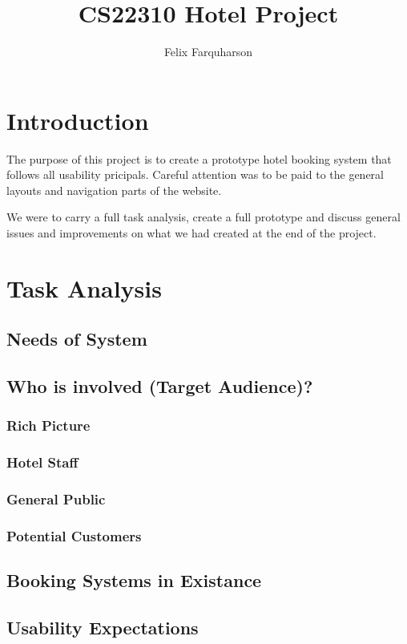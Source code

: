 \documentclass{article}
\begin{document}
\title{CS22310 Hotel Project}
\author{Felix Farquharson}

\maketitle
\maketableofcontents

\section{Introduction}
The purpose of this project is to create a prototype hotel booking system
that follows all usability pricipals. Careful attention was to be paid to
the general layouts and navigation parts of the website.

We were to carry a full task analysis, create a full prototype and discuss
general issues and improvements on what we had created at the end of the 
project.

\section{Task Analysis}
\subsection{Needs of System}
\subsection{Who is involved (Target Audience)?}
\subsubsection{Rich Picture}
\subsubsection{Hotel Staff}
\subsubsection{General Public}
\subsubsection{Potential Customers}
\subsection{Booking Systems in Existance}
\subsection{Usability Expectations}
\end{document}

